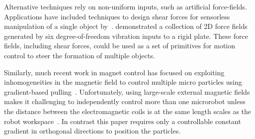 Alternative techniques rely on non-uniform inputs, such as artificial force-fields.
Applications have included techniques to design shear forces for sensorless manipulation of a single object by~\cite{lamiraux+2001:ra}.  
\cite{vose2012sliding} demonstrated a collection of 2D force fields generated by six degree-of-freedom vibration inputs to a rigid plate.  These force fields, including shear forces, could be used as a set of primitives for motion control to steer the formation of multiple objects. %

Similarly, much recent work in magnet control has focused on exploiting inhomogeneities in the magnetic field to control multiple micro particles  using gradient-based pulling~\cite{Salmanipour2018EightDOF,Denasi2018independent}.  
Unfortunately, using large-scale external magnetic fields makes it challenging to independently control more than one microrobot unless the  distance between the electromagnetic coils is at the same length scales as the robot workspace~\cite{diller2016six, Denasi2018independent, Salmanipour2018EightDOF }. In contrast %
 this paper requires only a controllable constant gradient in orthogonal directions to position the particles.



